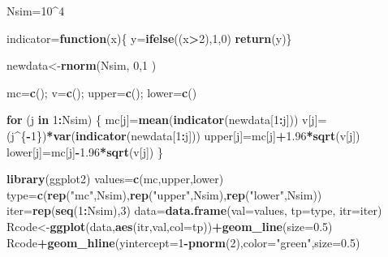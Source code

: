 \documentclass[]{book}
\newenvironment{Shaded}{\begin{snugshade}}{\end{snugshade}}
\newcommand{\KeywordTok}[1]{\textcolor[rgb]{0.13,0.29,0.53}{\textbf{#1}}}
\newcommand{\DataTypeTok}[1]{\textcolor[rgb]{0.13,0.29,0.53}{#1}}
\newcommand{\DecValTok}[1]{\textcolor[rgb]{0.00,0.00,0.81}{#1}}
\newcommand{\FloatTok}[1]{\textcolor[rgb]{0.00,0.00,0.81}{#1}}
\newcommand{\StringTok}[1]{\textcolor[rgb]{0.31,0.60,0.02}{#1}}
\newcommand{\ControlFlowTok}[1]{\textcolor[rgb]{0.13,0.29,0.53}{\textbf{#1}}}
\newcommand{\OperatorTok}[1]{\textcolor[rgb]{0.81,0.36,0.00}{\textbf{#1}}}
\newcommand{\NormalTok}[1]{#1}
\begin{document}
\begin{Shaded}
\begin{Highlighting}[]
\NormalTok{Nsim=}\DecValTok{10}\OperatorTok{^}\DecValTok{4}

\NormalTok{indicator=}\ControlFlowTok{function}\NormalTok{(x)\{}
\NormalTok{y=}\KeywordTok{ifelse}\NormalTok{((x}\OperatorTok{>}\DecValTok{2}\NormalTok{),}\DecValTok{1}\NormalTok{,}\DecValTok{0}\NormalTok{)}
\KeywordTok{return}\NormalTok{(y)\}}

\NormalTok{newdata<-}\KeywordTok{rnorm}\NormalTok{(Nsim, }\DecValTok{0}\NormalTok{,}\DecValTok{1}\NormalTok{ )}

\NormalTok{mc=}\KeywordTok{c}\NormalTok{(); v=}\KeywordTok{c}\NormalTok{(); upper=}\KeywordTok{c}\NormalTok{(); lower=}\KeywordTok{c}\NormalTok{()}

\ControlFlowTok{for}\NormalTok{ (j }\ControlFlowTok{in} \DecValTok{1}\OperatorTok{:}\NormalTok{Nsim)}
\NormalTok{\{}
\NormalTok{mc[j]=}\KeywordTok{mean}\NormalTok{(}\KeywordTok{indicator}\NormalTok{(newdata[}\DecValTok{1}\OperatorTok{:}\NormalTok{j]))}
\NormalTok{v[j]=(j}\OperatorTok{^}\NormalTok{\{}\OperatorTok{-}\DecValTok{1}\NormalTok{\})}\OperatorTok{*}\KeywordTok{var}\NormalTok{(}\KeywordTok{indicator}\NormalTok{(newdata[}\DecValTok{1}\OperatorTok{:}\NormalTok{j]))}
\NormalTok{upper[j]=mc[j]}\OperatorTok{+}\FloatTok{1.96}\OperatorTok{*}\KeywordTok{sqrt}\NormalTok{(v[j])}
\NormalTok{lower[j]=mc[j]}\OperatorTok{-}\FloatTok{1.96}\OperatorTok{*}\KeywordTok{sqrt}\NormalTok{(v[j])}
\NormalTok{\}}

\KeywordTok{library}\NormalTok{(ggplot2)}
\NormalTok{values=}\KeywordTok{c}\NormalTok{(mc,upper,lower)}
\NormalTok{type=}\KeywordTok{c}\NormalTok{(}\KeywordTok{rep}\NormalTok{(}\StringTok{"mc"}\NormalTok{,Nsim),}\KeywordTok{rep}\NormalTok{(}\StringTok{"upper"}\NormalTok{,Nsim),}\KeywordTok{rep}\NormalTok{(}\StringTok{"lower"}\NormalTok{,Nsim))}
\NormalTok{iter=}\KeywordTok{rep}\NormalTok{(}\KeywordTok{seq}\NormalTok{(}\DecValTok{1}\OperatorTok{:}\NormalTok{Nsim),}\DecValTok{3}\NormalTok{)}
\NormalTok{data=}\KeywordTok{data.frame}\NormalTok{(}\DataTypeTok{val=}\NormalTok{values, }\DataTypeTok{tp=}\NormalTok{type, }\DataTypeTok{itr=}\NormalTok{iter)}
\NormalTok{Rcode<-}\KeywordTok{ggplot}\NormalTok{(data,}\KeywordTok{aes}\NormalTok{(itr,val,}\DataTypeTok{col=}\NormalTok{tp))}\OperatorTok{+}\KeywordTok{geom_line}\NormalTok{(}\DataTypeTok{size=}\FloatTok{0.5}\NormalTok{)}
\NormalTok{Rcode}\OperatorTok{+}\KeywordTok{geom_hline}\NormalTok{(}\DataTypeTok{yintercept=}\DecValTok{1}\OperatorTok{-}\KeywordTok{pnorm}\NormalTok{(}\DecValTok{2}\NormalTok{),}\DataTypeTok{color=}\StringTok{"green"}\NormalTok{,}\DataTypeTok{size=}\FloatTok{0.5}\NormalTok{)}
\end{Highlighting}
\end{Shaded}
\end{document}
